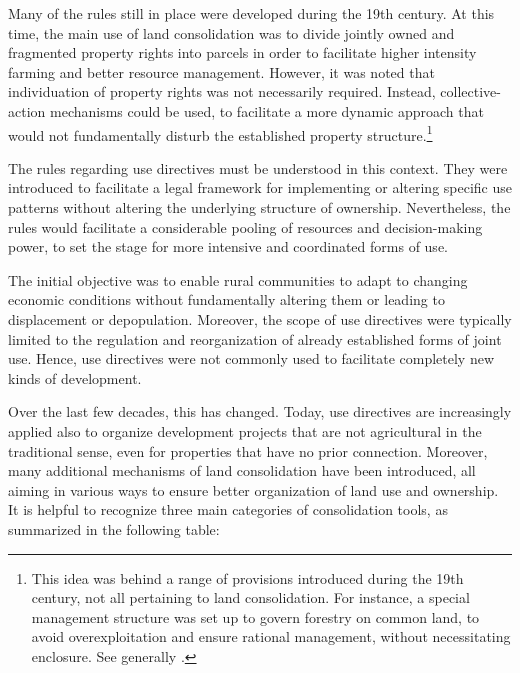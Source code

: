 Many of the rules still in place were developed during the 19th century. At this time, the main use of land consolidation was to divide jointly owned and fragmented property rights into parcels in order to facilitate higher intensity farming and better resource management.  However, it was noted that individuation of property rights was not necessarily required. Instead, collective-action mechanisms could be used, to facilitate a more dynamic approach that would not fundamentally disturb the established property structure.\footnote{This idea was behind a range of provisions introduced during the 19th century, not all pertaining to land consolidation. For instance, a special management structure was set up to govern forestry on common land, to avoid overexploitation and ensure rational management, without necessitating enclosure. See generally \cite{stenseth10a}.}

The rules regarding use directives must be understood in this context. They were introduced to facilitate a legal framework for implementing or altering specific use patterns without altering the underlying structure of ownership. Nevertheless, the rules would facilitate a considerable pooling of resources and decision-making power, to set the stage for more intensive and coordinated forms of use.

The initial objective was to enable rural communities to adapt to changing economic conditions without fundamentally altering them or leading to displacement or depopulation. Moreover, the scope of use directives were typically limited to the regulation and reorganization of already established forms of joint use. Hence, use directives were not commonly used to facilitate completely new kinds of development.

Over the last few decades, this has changed. Today, use directives are increasingly applied also to organize development projects that are not agricultural in the traditional sense, even for properties that have no prior connection. Moreover, many additional mechanisms of land consolidation have been introduced, all aiming in various ways to ensure better organization of land use and ownership. It is helpful to recognize three main categories of consolidation tools, as summarized in the following table:

